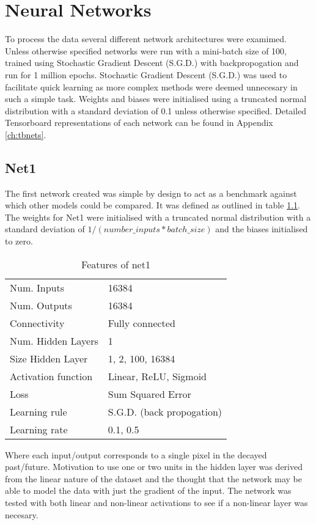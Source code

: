 \chapter{Neural Networks}

To process the data several different network architectures were examimed. 
Unless otherwise specified networks were run with a mini-batch size of 100, trained using Stochastic Gradient Descent (S.G.D.) with backpropogation and run for 1 million epochs. 
Stochastic Gradient Descent (S.G.D.) was used to facilitate quick learning as more complex methods were deemed unnecesary in such a simple task. 
Weights and biases were initialised using a truncated normal distribution with a standard deviation of 0.1 unless otherwise specified.
Detailed Tensorboard representations of each network can be found in Appendix \ref{ch:tbnets}.

\section{Net1}
The first network created was simple by design to act as a benchmark against which other models could be compared. 
It was defined as outlined in table \ref{table:net1def}.
The weights for Net1 were initialised with a truncated normal distribution with a standard deviation of $1 / ( number\_inputs * batch\_size )$ and the biases initialised to zero.

\begin{table}[h]
\centering
\begin{tabular}{ | l | l | }
    \hline
    Num. Inputs & 16384 \\
    Num. Outputs & 16384 \\
    Connectivity & Fully connected \\
    Num. Hidden Layers & 1 \\
    Size Hidden Layer & 1, 2, 100, 16384  \\
    Activation function & Linear, ReLU, Sigmoid \\
    Loss & Sum Squared Error \\
    Learning rule & S.G.D. (back propogation) \\
    Learning rate & 0.1, 0.5 \\
    \hline
\end{tabular}
\caption{Features of net1}
\label{table:net1def}
\end{table}

Where each input/output corresponds to a single pixel in the decayed past/future. 
Motivation to use one or two units in the hidden layer was derived from the linear nature of the dataset and the thought that the network may be able to model the data with just the gradient of the input.
The network was tested with both linear and non-linear activations to see if a non-linear layer was necesary. 


